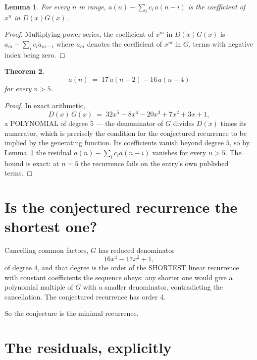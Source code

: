 \documentclass[11pt,a4paper]{article}
\theoremstyle{plain}
\newtheorem{theorem}{Theorem}
\newtheorem{lemma}[theorem]{Lemma}
\theoremstyle{definition}
\begin{document}
\begin{lemma}\label{lem:key}
For every $n$ in range, $a(n)-\sum_i c_i\,a(n-i)$ is the coefficient of $x^{n}$ in
$D(x)G(x)$.
\end{lemma}

\begin{proof}
Multiplying power series, the coefficient of $x^{m}$ in $D(x)G(x)$ is
$a_m-\sum_i c_i a_{m-i}$ where $a_m$ denotes the coefficient of $x^{m}$ in $G$, terms with
negative index being zero.
\end{proof}

\begin{theorem}
\[
a(n)\;=\;17\,a(n-2) - 16\,a(n-4)
\]
for every $n>5$.
\end{theorem}

\begin{proof}
In exact arithmetic,
\[
D(x)\,G(x)\;=\;32 x^{5} - 8 x^{4} - 20 x^{3} + 7 x^{2} + 3 x + 1,
\]
a POLYNOMIAL of degree $5$ --- the denominator of $G$ divides $D(x)$ times its numerator,
which is precisely the condition for the conjectured recurrence to be implied by the
generating function. Its coefficients vanish beyond degree $5$, so by
Lemma~\ref{lem:key} the residual $a(n)-\sum_ic_ia(n-i)$ vanishes for every
$n>5$. The bound is exact: at $n=5$ the recurrence fails on the entry's own published terms.
\end{proof}

\section{Is the conjectured recurrence the shortest one?}

Cancelling common factors, $G$ has reduced denominator
\[
16 x^{4} - 17 x^{2} + 1,
\]
of degree $4$, and that degree is the order of the SHORTEST linear recurrence with
constant coefficients the sequence obeys: any shorter one would give a polynomial multiple of
$G$ with a smaller denominator, contradicting the cancellation. The conjectured recurrence has
order $4$.

So the conjecture is the minimal recurrence.

\section{The residuals, explicitly}
\end{document}
